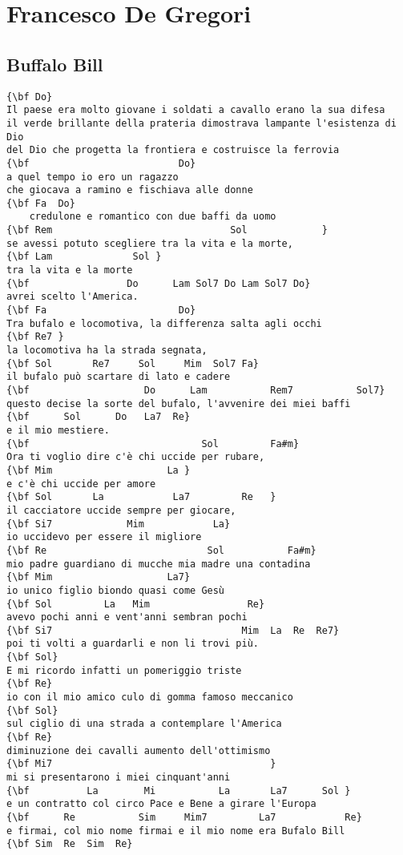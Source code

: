 \documentclass[a4paper]{article}
\begin{document}
\section{Francesco De Gregori}
\subsection{Buffalo Bill}
\begin{Verbatim}[commandchars=\\\{\}]
{\bf Do}
Il paese era molto giovane i soldati a cavallo erano la sua difesa
il verde brillante della prateria dimostrava lampante l'esistenza di Dio
del Dio che progetta la frontiera e costruisce la ferrovia
{\bf                          Do}
a quel tempo io ero un ragazzo 
che giocava a ramino e fischiava alle donne
{\bf Fa  Do}
    credulone e romantico con due baffi da uomo
{\bf Rem                               Sol             }
se avessi potuto scegliere tra la vita e la morte, 
{\bf Lam              Sol }
tra la vita e la morte
{\bf                 Do      Lam Sol7 Do Lam Sol7 Do}
avrei scelto l'America.
{\bf Fa                       Do}
Tra bufalo e locomotiva, la differenza salta agli occhi
{\bf Re7 }
la locomotiva ha la strada segnata, 
{\bf Sol       Re7     Sol     Mim  Sol7 Fa}
il bufalo può scartare di lato e cadere
{\bf                    Do      Lam           Rem7           Sol7}
questo decise la sorte del bufalo, l'avvenire dei miei baffi
{\bf      Sol      Do   La7  Re}
e il mio mestiere.
{\bf                              Sol         Fa#m}
Ora ti voglio dire c'è chi uccide per rubare, 
{\bf Mim                    La }
e c'è chi uccide per amore
{\bf Sol       La            La7         Re   }
il cacciatore uccide sempre per giocare, 
{\bf Si7             Mim            La}
io uccidevo per essere il migliore
{\bf Re                            Sol           Fa#m}
mio padre guardiano di mucche mia madre una contadina
{\bf Mim                    La7}
io unico figlio biondo quasi come Gesù
{\bf Sol         La   Mim                 Re}
avevo pochi anni e vent'anni sembran pochi
{\bf Si7                                 Mim  La  Re  Re7}
poi ti volti a guardarli e non li trovi più.
{\bf Sol}
E mi ricordo infatti un pomeriggio triste
{\bf Re}
io con il mio amico culo di gomma famoso meccanico
{\bf Sol}
sul ciglio di una strada a contemplare l'America
{\bf Re}
diminuzione dei cavalli aumento dell'ottimismo
{\bf Mi7                                      }
mi si presentarono i miei cinquant'anni 
{\bf          La        Mi           La       La7      Sol }
e un contratto col circo Pace e Bene a girare l'Europa
{\bf      Re           Sim     Mim7         La7            Re}
e firmai, col mio nome firmai e il mio nome era Bufalo Bill
{\bf Sim  Re  Sim  Re}

\end{Verbatim}
\newpage
\end{document}
